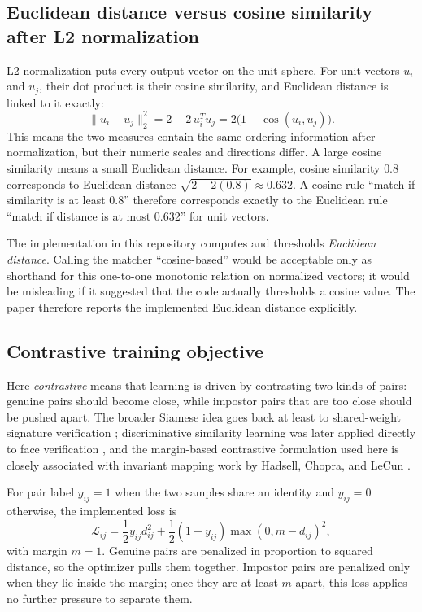 \documentclass[10pt,a4paper]{article}
\begin{document}
\subsection{Euclidean distance versus cosine similarity after L2 normalization}

L2 normalization puts every output vector on the unit sphere. For unit vectors $u_i$ and
$u_j$, their dot product is their cosine similarity, and Euclidean distance is linked to it
exactly:
\begin{equation}
\|u_i-u_j\|_2^2 = 2-2\,u_i^T u_j = 2\bigl(1-\cos(u_i,u_j)\bigr).
\end{equation}
This means the two measures contain the same ordering information after normalization, but
their numeric scales and directions differ. A large cosine similarity means a small
Euclidean distance. For example, cosine similarity $0.8$ corresponds to Euclidean distance
$\sqrt{2-2(0.8)}\approx0.632$. A cosine rule ``match if similarity is at least 0.8'' therefore
corresponds exactly to the Euclidean rule ``match if distance is at most 0.632'' for unit
vectors.

The implementation in this repository computes and thresholds \emph{Euclidean distance}.
Calling the matcher ``cosine-based'' would be acceptable only as shorthand for this
one-to-one monotonic relation on normalized vectors; it would be misleading if it suggested
that the code actually thresholds a cosine value. The paper therefore reports the implemented
Euclidean distance explicitly.

\subsection{Contrastive training objective}

Here \emph{contrastive} means that learning is driven by contrasting two kinds of pairs:
genuine pairs should become close, while impostor pairs that are too close should be pushed
apart. The broader Siamese idea goes back at least to shared-weight signature verification
\cite{bromley1993}; discriminative similarity learning was later applied directly to face
verification \cite{chopra2005}, and the margin-based contrastive formulation used here is
closely associated with invariant mapping work by Hadsell, Chopra, and LeCun
\cite{hadsell2006}.

For pair label $y_{ij}=1$ when the two samples share an identity and $y_{ij}=0$ otherwise,
the implemented loss is
\begin{equation}
\mathcal{L}_{ij}=\frac{1}{2}y_{ij}d_{ij}^{2}
+\frac{1}{2}(1-y_{ij})\max(0,m-d_{ij})^{2},
\end{equation}
with margin $m=1$. Genuine pairs are penalized in proportion to squared distance, so the
optimizer pulls them together. Impostor pairs are penalized only when they lie inside the
margin; once they are at least $m$ apart, this loss applies no further pressure to separate
them.
\end{document}
